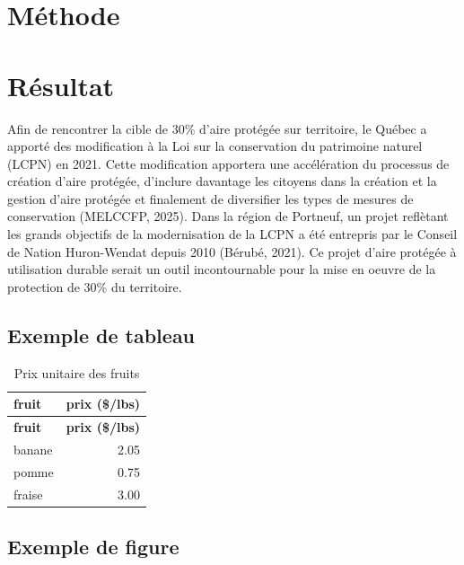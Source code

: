 \documentclass[
  12pt,
]{article}
\begin{document}
\section{Méthode}\label{muxe9thode}

\section{Résultat}\label{ruxe9sultat}

Afin de rencontrer la cible de 30\% d'aire protégée sur territoire, le
Québec a apporté des modification à la Loi sur la conservation du
patrimoine naturel (LCPN) en 2021. Cette modification apportera une
accélération du processus de création d'aire protégée, d'inclure
davantage les citoyens dans la création et la gestion d'aire protégée et
finalement de diversifier les types de mesures de conservation (MELCCFP,
2025). Dans la région de Portneuf, un projet reflètant les grands
objectifs de la modernisation de la LCPN a été entrepris par le Conseil
de Nation Huron-Wendat depuis 2010 (Bérubé, 2021). Ce projet d'aire
protégée à utilisation durable serait un outil incontournable pour la
mise en oeuvre de la protection de 30\% du territoire.

\subsection{Exemple de tableau}\label{exemple-de-tableau}

\begin{longtable}[]{@{}lr@{}}
\caption{Prix unitaire des fruits}\tabularnewline
\toprule\noalign{}
\textbf{fruit} & \textbf{prix (\$/lbs)} \\
\midrule\noalign{}
\endfirsthead
\toprule\noalign{}
\textbf{fruit} & \textbf{prix (\$/lbs)} \\
\midrule\noalign{}
\endhead
\bottomrule\noalign{}
\endlastfoot
banane & 2.05 \\
pomme & 0.75 \\
fraise & 3.00 \\
\end{longtable}

\subsection{Exemple de figure}\label{exemple-de-figure}
\end{document}
